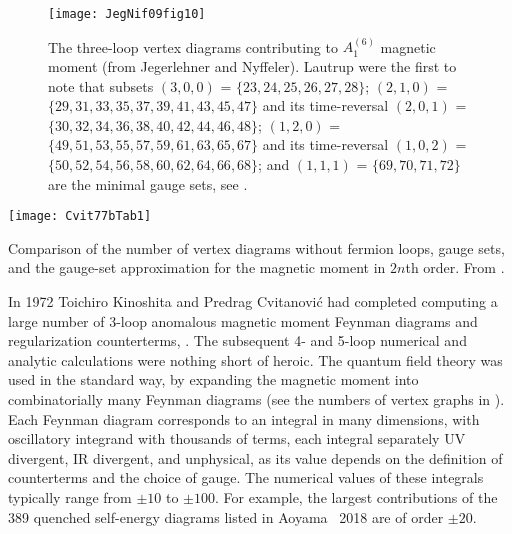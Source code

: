 \begin{figure}
\begin{center}
\texttt{[image: JegNif09fig10]}
\end{center}
\caption{\label{JegNif09fig10}
The three-loop vertex diagrams contributing to $A^{(6)}_1$
magnetic moment
(from Jegerlehner and Nyffeler).
Lautrup \etal{} were the first to note that
subsets
$(3,0,0)$ = $\{23,24,25,26,27,28\}$;
$(2,1,0)$ = $\{29,31,33,35,37,39,41,43,45,47\}$ and its time-reversal
$(2,0,1)$ = $\{30,32,34,36,38,40,42,44,46,48\}$;
$(1,2,0)$ = $\{49,51,53,55,57,59,61,63,65,67\}$ and its time-reversal
$(1,0,2)$ = $\{50,52,54,56,58,60,62,64,66,68\}$;
and
$(1,1,1)$ = $\{69,70,71,72\}$
are the minimal gauge sets, see .
}
 \end{figure}

\begin{table}
\begin{center}
\texttt{[image: Cvit77bTab1]}
\end{center}
\caption{\label{Cvit77bTab1}
Comparison of the number of vertex diagrams without fermion loops, gauge
sets, and the gauge-set approximation  for the magnetic
moment in $2n$th order.
From .
}
\end{table}

\noindent
In 1972 Toichiro Kinoshita and Predrag Cvitanovi\'c had completed
computing a large number of 3-loop anomalous magnetic moment Feynman
diagrams and regularization counterterms,
.
The subsequent 4- and 5-loop numerical and analytic calculations were
nothing short of heroic. The
quantum field theory was used in the standard way, by
expanding the magnetic moment into combinatorially many Feynman diagrams
(see the numbers of vertex graphs in ).
Each Feynman diagram corresponds to an integral in many dimensions, with
oscillatory integrand with thousands of terms, each integral separately
UV divergent, IR divergent, and unphysical, as its value depends on the
definition of counterterms and the choice of gauge.
The numerical values of these integrals typically range from  $\pm 10$
to $\pm 100$. For example, the largest contributions of
the 389 quenched self-energy diagrams listed in
Aoyama \etal\ 2018 are of order $\pm 20$.

